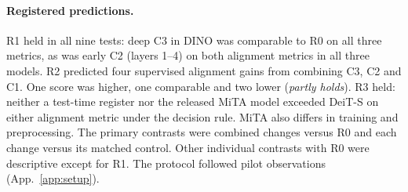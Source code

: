 \documentclass{article}
\begin{document}
\paragraph{Registered predictions.} R1 held in all nine tests: deep C3 in DINO was comparable to R0 on all three metrics, as was early C2 (layers 1--4) on both alignment metrics in all three models. R2 predicted four supervised alignment gains from combining C3, C2 and C1. One score was higher, one comparable and two lower (\emph{partly holds}). R3 held: neither a test-time register nor the released MiTA model exceeded DeiT-S on either alignment metric under the decision rule. MiTA also differs in training and preprocessing. The primary contrasts were combined changes versus R0 and each change versus its matched control. Other individual contrasts with R0 were descriptive except for R1. The protocol followed pilot observations (App.~\ref{app:setup}).
\clearpage

\label{main:end}
\clearpage
{\small}
\clearpage\appendix

\end{document}
